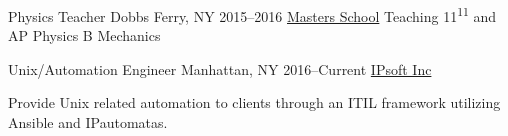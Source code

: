 \begin{cventries}
\cventry
    {Physics Teacher}
    {Dobbs Ferry, NY}
    {2015--2016}
    {\href{mastersny.org}{Masters School}}
    {Teaching 11\textsuperscript{11} and AP Physics B Mechanics}

\cventry
    {Unix/Automation Engineer}
    {Manhattan, NY}
    {2016--Current}
    {\href{www.ipsoft.com}{IPsoft Inc}}
    \begin{cvitems}
       \item {Provide Unix related automation to clients through an ITIL framework utilizing Ansible and IPautomatas.}
    \end{cvitems}

\end{cventries}


